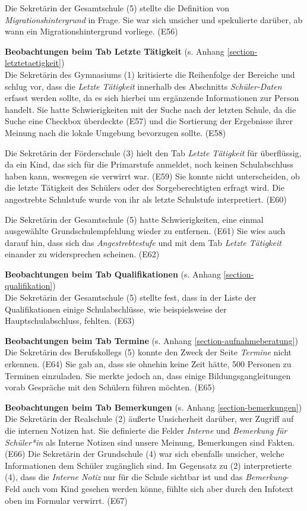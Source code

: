 Die Sekretärin der Gesamtschule (5) stellte die Definition von \textit{Migrationshintergrund} in Frage. Sie war sich unsicher und spekulierte darüber, ab wann ein Migrationshintergrund vorliege. (E56)

\textbf{Beobachtungen beim Tab \glqq Letzte Tätigkeit\grqq{}} (s. Anhang \ref{section-letztetaetigkeit})\\
Die Sekretärin des Gymnasiums (1) kritisierte die Reihenfolge der Bereiche und schlug vor, dass die \textit{Letzte Tätigkeit} innerhalb des Abschnitts \textit{Schüler-Daten} erfasst werden sollte, da es sich hierbei um ergänzende Informationen zur Person handelt. Sie hatte Schwierigkeiten mit der Suche nach der letzten Schule, da die Suche eine Checkbox überdeckte (E57) und die Sortierung der Ergebnisse ihrer Meinung nach die lokale Umgebung bevorzugen sollte. (E58)

Die Sekretärin der Förderschule (3) hielt den Tab \textit{Letzte Tätigkeit} für überflüssig, da ein Kind, das sich für die Primarstufe anmeldet, noch keinen Schulabschluss haben kann, weswegen sie verwirrt war. (E59) Sie konnte nicht unterscheiden, ob die letzte Tätigkeit des Schülers oder des Sorgeberechtigten erfragt wird. Die angestrebte Schulstufe wurde von ihr als letzte Schulstufe interpretiert. (E60)

Die Sekretärin der Gesamtschule (5) hatte Schwierigkeiten, eine einmal ausgewählte Grundschulempfehlung wieder zu entfernen. (E61) Sie wies auch darauf hin, dass sich das \textit{Angestrebtestufe} und mit dem Tab \textit{Letzte Tätigkeit} einander zu widersprechen scheinen. (E62)

\textbf{Beobachtungen beim Tab \glqq Qualifikationen\grqq{}} (s. Anhang \ref{section-qualifikation})\\
Die Sekretärin der Gesamtschule (5) stellte fest, dass in der Liste der Qualifikationen einige Schulabschlüsse, wie beispielsweise der Hauptschulabschluss, fehlten. (E63) 

\textbf{Beobachtungen beim Tab \glqq Termine\grqq{}} (s. Anhang \ref{section-aufnahmeberatung})\\
Die Sekretärin des Berufskollegs (5) konnte den Zweck der Seite \textit{Termine} nicht erkennen. (E64) Sie gab an, dass sie ohnehin keine Zeit hätte, 500 Personen zu Terminen einzuladen. Sie merkte jedoch an, dass einige Bildungsgangleitungen vorab Gespräche mit den Schülern führen möchten. (E65)

\textbf{Beobachtungen beim Tab \glqq Bemerkungen\grqq{}} (s. Anhang \ref{section-bemerkungen})\\
Die Sekretärin der Realschule (2) äußerte Unsicherheit darüber, wer Zugriff auf die internen Notizen hat. Sie definierte die Felder \textit{Interne} und \textit{Bemerkung für Schüler*in} als \glqq Interne Notizen sind unsere Meinung, Bemerkungen sind Fakten\grqq{}. (E66) Die Sekretärin der Grundschule (4) war sich ebenfalls unsicher, welche Informationen dem Schüler zugänglich sind. Im Gegensatz zu (2) interpretierte (4), dass die \textit{Interne Notiz} nur für die Schule sichtbar ist und das \textit{Bemerkung}-Feld auch vom Kind gesehen werden könne, fühlte sich aber durch den Infotext oben im Formular verwirrt. (E67)

